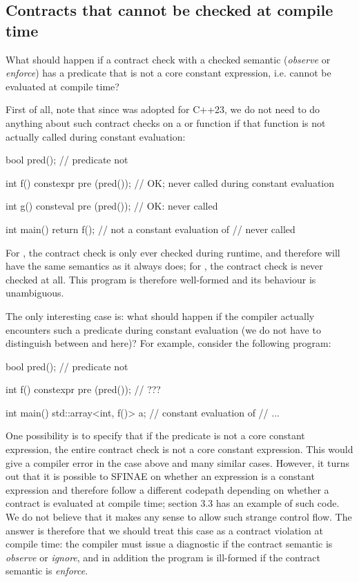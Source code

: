 \subsection{Contracts that cannot be checked at compile time}
\label{subsec:noncore}

What should happen if a contract check with a checked semantic (\emph{observe} or \emph{enforce}) has a predicate that is not a core constant expression, i.e. cannot be evaluated at compile time?

First of all, note that since \cite{P2448R2} was adopted for C++23, we do not need to do anything about such contract checks on a  or  function if that function is not actually called during constant evaluation:

\begin{codeblock}
bool pred();  // predicate not 

int f() constexpr
  pre (pred());  // OK; never called during constant evaluation
  
int g() consteval
  pre (pred());  // OK: never called

int main() {
  return f();  // not a constant evaluation of 
  //  never called
}
\end{codeblock}

For , the contract check is only ever checked during runtime, and therefore will have the same semantics as it always does; for , the contract check is never checked at all. This program is therefore well-formed and its behaviour is unambiguous.

The only interesting case is: what should happen if the compiler actually encounters such a predicate during constant evaluation (we do not have to distinguish between  and  here)? For example, consider the following program:

\begin{codeblock}
bool pred();  // predicate not 

int f() constexpr
  pre (pred());  // ???

int main() {
  std::array<int, f()> a;  // constant evaluation of 
  // ...
}
\end{codeblock}

One possibility is to specify that if the predicate is not a core constant expression, the entire contract check is not a core constant expression. This would give a compiler error in the case above and many similar cases. However, it turns out that it is possible to SFINAE on whether an expression is a constant expression and therefore follow a different codepath depending on whether a contract is evaluated at compile time; \cite{P2932R1} section 3.3 has an example of such code. We do not believe that it makes any sense to allow such strange control flow. The answer is therefore that we should treat this case as a contract violation at compile time: the compiler must issue a diagnostic if the contract semantic is \emph{observe} or \emph{ignore}, and in addition the program is ill-formed if the contract semantic is \emph{enforce}.


